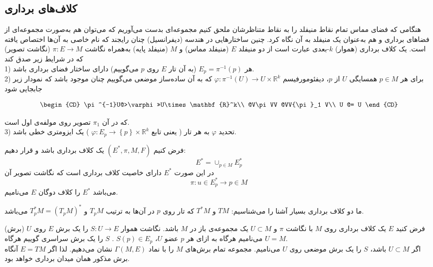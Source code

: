 \subsection{کلاف‌های برداری}
هنگامی که فضای مماس تمام نقاط منیفلد را به نقاط متناظرشان ملحق کنیم مجموعه‌ای بدست می‌آوریم که می‌توان هم به‌صورت مجموعه‌ای از فضاهای برداری و هم به‌عنوان یک منیفلد به آن نگاه کرد. چنین ساختارهایی در هندسه (دیفرانسیل) چنان رایجند که نام خاصی به آن‌ها اختصاص یافته است.
یک کلاف برداری (هموار) $k$-بعدی  عبارت است از دو منیفلد $E$ (منیفلد مماس) و $M$ (منیفلد پایه) به‌همراه نگاشت $\pi:E\longrightarrow M$ (نگاشت تصویر) که در شرایط زیر صدق کند\\
1) هر  
$ E_p= \pi^{-1}(p ) $ 
(به آن تار $E$ روی $p$  می‌گوییم) دارای ساختار فضای برداری باشد.\\
2) برای هر $p\in M$ همسایگی $U$ از $p$، دیفئومورفیسم 
$ \varphi:\pi^{-1}(U)\longrightarrow U\times \mathbb{R}^k $
 که به آن ساده‌ساز موضعی می‌گوییم چنان موجود باشد که نمودار زیر جابجایی شود

 $$ \begin{CD}
 \pi^{-1}U@>\varphi>>U\times\mathbf{R}^k\\
 @V\pi VV @VV{\pi}_1 V\\
 U @= U
 \end{CD} $$
 
که در آن $\pi_1$ تصویر روی مولفه‌ی اول است.\\
3) تحدید $\varphi$ به هر تار ( یعنی تابع $\varphi:E_p\longrightarrow \left\lbrace p \right \rbrace\times \mathbb{R}^k$ ) یک 
ایزومتری خطی باشد.  \\                                          
\begin{definition}
فرض  کنیم 
$ (E^*,\pi,M,F) $  یک   کلاف  برداری  باشد و  قرار دهیم:  
$$ E ^*= \cup _{p \in M} E_p ^* $$ 
    در این  صورت $  E^* $   دارای  خاصیت  کلاف  برداری است  که  نگاشت  تصویر  آن 
$$ \pi : u \in  E_p ^* \longrightarrow p \in M $$
  می‌باشد $ E ^* $ را کلاف  دوگان  $ E $   می‌نامیم.
\end{definition}

ما دو کلاف برداری بسیار آشنا را می‌شناسیم: $TM$ و $T^*M$ که تار روی $p$ در آن‌ها به 
ترتیب $ T_pM $ و 
$ T^*_p M = (T_p M)^* $
 می‌باشد.
\begin {definition}(برش)
فرض کنید $ E $ یک  کلاف برداری  روی $ M $   با  نگاشت  $ \pi $  و  $ U \subset M $ 
یک  مجموعه‌ی  باز  در $ M $ باشد.  نگاشت  هموار $ S : U \longrightarrow E $
را  یک  برش  $ E $ روی $ U $ می‌نامیم هرگاه  به ازای  هر  $ p $ عضو  
$ U $، $ S(p) \in {E_p} $ 
. $ S $ را  یک  برش  سراسری  گوییم  هرگاه $ U = M $.
 \\ اگر  $ U \subset M $  باشد، $ S $  را  یک  برش  موضعی  روی  $ U $   می‌نامیم. مجموعه  تمام  برش‌های $ M $ را  با  نماد  $ \Gamma (M , E) $ 
نشان  می‌دهیم. لذا اگر $E = TM$ آنگاه برش مذکور همان میدان برداری خواهد بود.
\end{definition}

